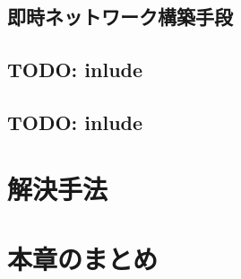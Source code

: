 \subsection{即時ネットワーク構築手段}

\newpage

\subsection{TODO: inlude}

\subsection{TODO: inlude}

\newpage

\section{解決手法}

\section{本章のまとめ}
